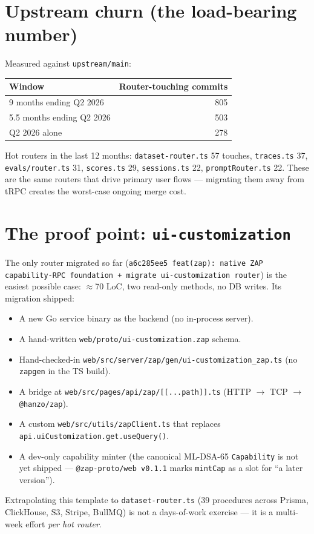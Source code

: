 \documentclass[11pt,letterpaper]{article}
\begin{document}
\section{Upstream churn (the load-bearing number)}
Measured against \texttt{upstream/main}:
\begin{center}
\begin{tabular}{lr}
\toprule
Window & Router-touching commits \\
\midrule
9 months ending Q2 2026 & 805 \\
5.5 months ending Q2 2026 & 503 \\
Q2 2026 alone & 278 \\
\bottomrule
\end{tabular}
\end{center}
Hot routers in the last 12 months: \texttt{dataset-router.ts} 57 touches, \texttt{traces.ts} 37, \texttt{evals/router.ts} 31, \texttt{scores.ts} 29, \texttt{sessions.ts} 22, \texttt{promptRouter.ts} 22. These are the same routers that drive primary user flows --- migrating them away from tRPC creates the worst-case ongoing merge cost.

\section{The proof point: \texttt{ui-customization}}
The only router migrated so far (\texttt{a6c285ee5 feat(zap): native ZAP capability-RPC foundation + migrate ui-customization router}) is the easiest possible case: $\approx$70 LoC, two read-only methods, no DB writes. Its migration shipped:
\begin{itemize}[leftmargin=1.2em,itemsep=2pt]
  \item A new Go service binary as the backend (no in-process server).
  \item A hand-written \texttt{web/proto/ui-customization.zap} schema.
  \item Hand-checked-in \texttt{web/src/server/zap/gen/ui-customization\_zap.ts} (no \texttt{zapgen} in the TS build).
  \item A bridge at \texttt{web/src/pages/api/zap/[[...path]].ts} (HTTP $\rightarrow$ TCP $\rightarrow$ \texttt{@hanzo/zap}).
  \item A custom \texttt{web/src/utils/zapClient.ts} that replaces \texttt{api.uiCustomization.get.useQuery()}.
  \item A dev-only capability minter (the canonical ML-DSA-65 \texttt{Capability} is not yet shipped --- \texttt{@zap-proto/web v0.1.1} marks \texttt{mintCap} as a slot for ``a later version'').
\end{itemize}
Extrapolating this template to \texttt{dataset-router.ts} (39 procedures across Prisma, ClickHouse, S3, Stripe, BullMQ) is not a days-of-work exercise --- it is a multi-week effort \emph{per hot router}.
\end{document}
